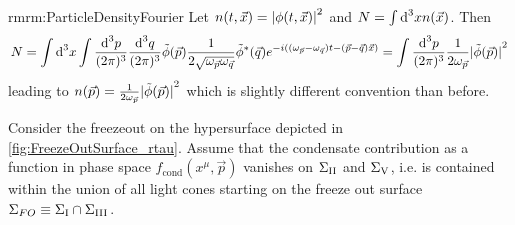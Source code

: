 \begin{rmrk}{rmrm:ParticleDensityFourier}
    Let $n(t,\vec{x})={\vert\phi(t,\vec{x})\vert}^2$ and $N=\int\text{d}^3xn(\vec{x})$. Then
    \begin{equation}
        N=\int\text{d}^3x\int\frac{\text{d}^3p}{(2\pi)^3}\frac{\text{d}^3q}{(2\pi)^3}\tilde{\phi}(\vec{p})\frac{1}{2\sqrt{\omega_{\vec{p}}\omega_{\vec{q}}}}\tilde{\phi}^*(\vec{q})e^{-{i}((\omega_{\vec{p}}-\omega_{\vec{q}})t-(\vec{p}-\vec{q})\vec{x})}=\int\frac{\text{d}^3p}{(2\pi)^3}\frac{1}{2\omega_{\vec{p}}}{\vert\tilde{\phi}(\vec{p})\vert}^2
    \end{equation}
    leading to $n(\vec{p})=\frac{1}{2\omega_{\vec{p}}}{\vert\tilde{\phi}(\vec{p})\vert}^2$ which is slightly different convention than before.
\end{rmrk}


Consider the freezeout on the hypersurface depicted in \ref{fig:FreezeOutSurface_rtau}. Assume that the condensate contribution as a function in phase space $f_{\text{cond}}(x^\mu,\vec{p})$ vanishes on $\Sigma_{\text{\rom{2}}}$ and $\Sigma_{\text{\rom{5}}}$, i.e. is contained within the union of all light cones starting on the freeze out surface $\Sigma_{FO}\equiv\Sigma_{\text{\rom{1}}}\cap\Sigma_\text{{\rom{3}}}$. 


